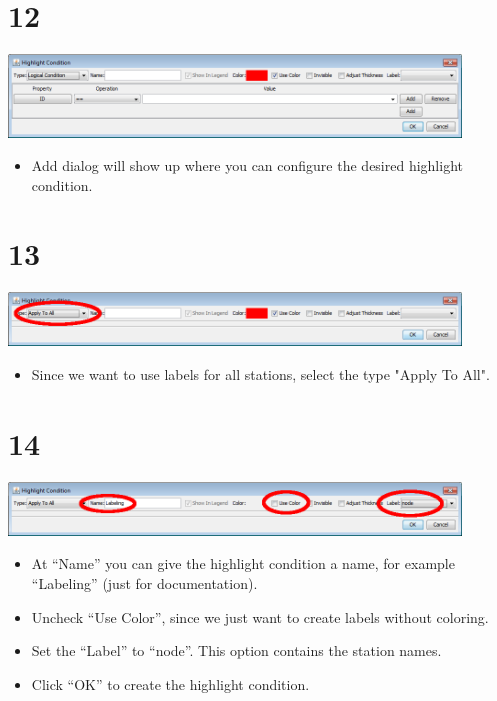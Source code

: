 \documentclass[10pt]{beamer}
\begin{document}
\section{12}
\begin{frame}
	\begin{center}
  		\includegraphics[width=0.9\textwidth]{12.png}
	\end{center}
	\begin{itemize}
		\item Add dialog will show up where you can configure the desired highlight condition.
	\end{itemize}
\end{frame}

\section{13}
\begin{frame}
	\begin{center}
  		\includegraphics[width=0.9\textwidth]{13.png}
	\end{center}
	\begin{itemize}
		\item Since we want to use labels for all stations, select the type "Apply To All".
	\end{itemize}
\end{frame}

\section{14}
\begin{frame}
	\begin{center}
  		\includegraphics[width=0.9\textwidth]{14.png}
	\end{center}
	\begin{itemize}
		\item At ``Name'' you can give the highlight condition a name, for example ``Labeling'' (just for documentation).
		\item Uncheck ``Use Color'', since we just want to create labels without coloring.
		\item Set the ``Label'' to ``node''.  This option contains the station names.
		\item Click ``OK'' to create the highlight condition.
	\end{itemize}
\end{frame}
\end{document}
